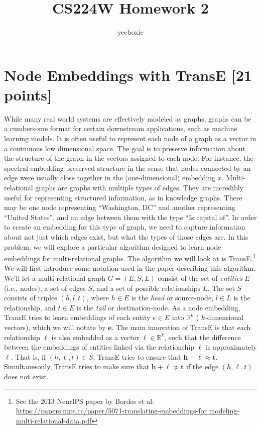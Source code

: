 \documentclass[11pt]{article}
\title{CS224W Homework 2}
\author{yeeboxie}
\numberwithin{figure}{section}
\begin{document}
\maketitle

\section{Node Embeddings with TransE [21 points]}

While many real world systems are effectively modeled as graphs, graphs can be a cumbersome format for certain downstream applications, such as machine learning models. It is often useful to represent each node of a graph as a vector in a continuous low dimensional space. The goal is to preserve information about the structure of the graph in the vectors assigned to each node. For instance, the spectral embedding preserved structure in the sense that nodes connected by an edge were usually close together in the (one-dimensional) embedding $x$.\newline
\noindent Multi-relational graphs are graphs with multiple types of edges. They are incredibly useful for representing structured information, as in knowledge graphs. There may be one node representing “Washington, DC” and another representing “United States”, and an edge between them with the type “Is capital of”. In order to create an embedding for this type of graph, we need to capture information about not just which edges exist, but what the types of those edges are. In this problem, we will explore a particular algorithm designed to learn node embeddings for multi-relational graphs. \newline
The algorithm we will look at is TransE.\footnote{See the 2013 NeurIPS paper by Bordes et al: \url{https://papers.nips.cc/paper/5071-translating-embeddings-for modeling-multi-relational-data.pdf}} \newline
We will first introduce some notation used in the paper describing this algorithm.
We’ll let a multi-relational graph $G = (E, S, L)$ consist of the set of \textit{entities} $E$ (i.e., nodes), a set of edges $S$, and a set of possible relationships $L$.
The set $S$ consists of triples $(h, l, t)$, where $h \in E$ is the \textit{head} or source-node, $l \in L$ is the relationship, and $t \in E$ is the \textit{tail} or destination-node.
As a node embedding, TransE tries to learn embeddings of each entity $e \in E$ into $\mathbb{R}^k$ ( $k$-dimensional vectors), which we will notate by $\mathbf{e}$. The main innovation of TransE is that each relationship $\ell$ is also embedded as a vector $\ell \in \mathbb{R}^k$, such that the difference between the embeddings of entities linked via the relationship $\ell$ is approximately $\ell$. That is, if $(h, \ell, t) \in S$, TransE tries to ensure that $\mathbf{h}+\boldsymbol{\ell} \approx \mathbf{t}$. Simultanesouly, TransE tries to make sure that $\mathbf{h}+\boldsymbol{\ell} \not\approx \mathbf{t}$ if the edge $(h, \ell, t)$ does not exist.\newline
\end{document}
